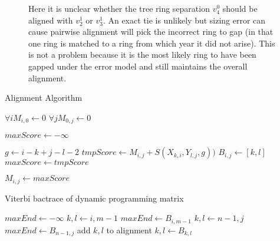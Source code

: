 \documentclass[11pt]{article}
\begin{document}
{\begin{figure}[h!]
\begin{center}
\caption{Here it is unclear whether the tree ring separation $v^0_4$ should be aligned with $v^1_2$ or $v^1_3$. An exact tie is unlikely but sizing error can cause pairwise alignment will pick the incorrect ring to gap (in that one ring is matched to a ring from which year it did not arise).  This is not a problem because it is the most likely ring to have been gapped under the error model and still maintains the overall alignment.
}
\end{center}
\end{figure}

}

\par{
\begin{algorithm}[h!]
\caption{Alignment Algorithm}
\begin{algorithmic}
\State $\forall i M_{i,0} \leftarrow 0$
\State $\forall j M_{0,j} \leftarrow 0$

	\State $maxScore \gets -\infty$
		
				\State $g \gets i-k+j-l-2$ 
				\State $tmpScore \gets M_{i,j}+S(X_{k,i},Y_{l,j}, g))$
					\State $B_{i,j} \gets [k,l]$
					\State $maxScore \gets tmpScore$
				\EndIf
				
			\EndFor
		\EndFor
		\State $M_{i,j} \gets maxScore$
	\EndFor
\EndFor
\EndProcedure
\end{algorithmic}
\end{algorithm}


\begin{algorithm}[h!]

\caption{Viterbi bactrace of dynamic programming matrix}
\begin{algorithmic}
\State $maxEnd \gets -\infty$ 
\State $k,l \gets i,m-1$
\State $maxEnd \gets B_{i,m-1}$
\EndIf
\EndFor
{}
\State $k,l \gets n-1,j$
\State $maxEnd \gets B_{n-1,j}$
\EndIf
\EndFor
\Statex
{}
\State add $k,l$ to alignment
\State $k,l \gets B_{k,l}$
\EndWhile
\EndProcedure
\end{algorithmic}
\end{algorithm}

}


\end{document}
